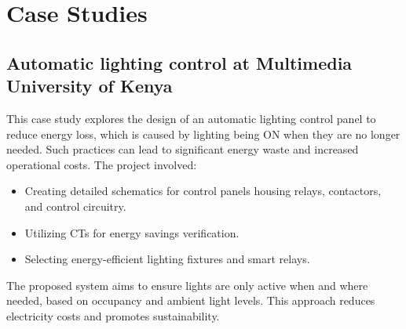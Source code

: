 \section{Case Studies}
\subsection{Automatic lighting control at Multimedia University of Kenya}
This case study explores the design of an automatic lighting control panel to reduce energy loss, which is caused by lighting being ON when they are no longer needed. Such practices can lead to significant energy waste and increased operational costs. The project involved:
\begin{itemize}
    \item Creating detailed schematics for control panels housing relays, contactors, and control circuitry.
    \item Utilizing CTs for energy savings verification.
    \item Selecting energy-efficient lighting fixtures and smart relays.
\end{itemize}
The proposed system aims to ensure lights are only active when and where needed, based on occupancy and ambient light levels. This approach reduces electricity costs and promotes sustainability.